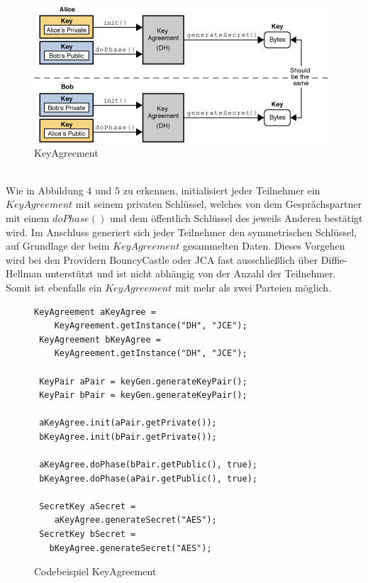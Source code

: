 \documentclass[paper=a4,11pt,german]{scrartcl} %
\begin{document}
\begin{figure}[htb]
	\centering
	\includegraphics[width=\textwidth]{KeyAgreement.jpeg}   
	\caption{KeyAgreement}
	\label{KeyAgreement}
\end{figure}\ \\
Wie in Abbildung 4  und 5 zu erkennen, initialisiert jeder Teilnehmer ein $KeyAgreement$ mit seinem privaten Schlüssel, welches von dem Gesprächspartner mit einem $doPhase()$ und dem öffentlich Schlüssel des jeweils Anderen bestätigt wird. Im Anschluss generiert sich jeder Teilnehmer den symmetrischen Schlüssel, auf Grundlage der beim $KeyAgreement$ gesammelten Daten. Dieses Vorgehen wird bei den Providern BouncyCastle oder JCA fast ausschließlich über Diffie-Hellman unterstützt und ist nicht abhängig von der Anzahl der Teilnehmer. Somit ist ebenfalls ein $KeyAgreement$ mit mehr als zwei Parteien möglich.
\begin{figure}[h]
\caption{Codebeispiel KeyAgreement}
\begin{lstlisting}[frame=shadowbox]
 KeyAgreement aKeyAgree =
  	KeyAgreement.getInstance("DH", "JCE");
 KeyAgreement bKeyAgree = 
  	KeyAgreement.getInstance("DH", "JCE");
   
 KeyPair aPair = keyGen.generateKeyPair();
 KeyPair bPair = keyGen.generateKeyPair();

 aKeyAgree.init(aPair.getPrivate());
 bKeyAgree.init(bPair.getPrivate());
 
 aKeyAgree.doPhase(bPair.getPublic(), true);
 bKeyAgree.doPhase(aPair.getPublic(), true);

 SecretKey aSecret =
   	aKeyAgree.generateSecret("AES");
 SecretKey bSecret =
   bKeyAgree.generateSecret("AES");
\end{lstlisting}
\label{KeyAgree}
\end{figure}
\end{document}
